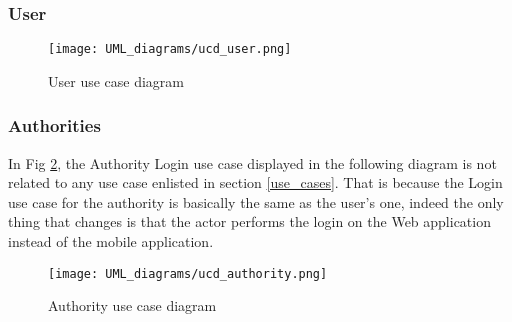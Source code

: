 \subsubsection{User}

\vfill

\begin{figure}[H]
  \centering
  \texttt{[image: UML\_diagrams/ucd\_user.png]}
  \caption{User use case diagram}
  \label{fig:user_ucd}
\end{figure}

\vfill
\newpage
\null


\subsubsection{Authorities}
In Fig \ref{fig:authority_ucd}, the Authority Login use case displayed in the following diagram is not related to any use case enlisted in section \ref{use_cases}. That is because the Login use case for the authority is basically the same as the user's one, indeed the only thing that changes is that the actor performs the login on the Web application instead of the mobile application.

\vfill


\begin{figure}[H]
  \centering
  \texttt{[image: UML\_diagrams/ucd\_authority.png]}
  \caption{Authority use case diagram}
  \label{fig:authority_ucd}
\end{figure}

\vfill
\newpage

